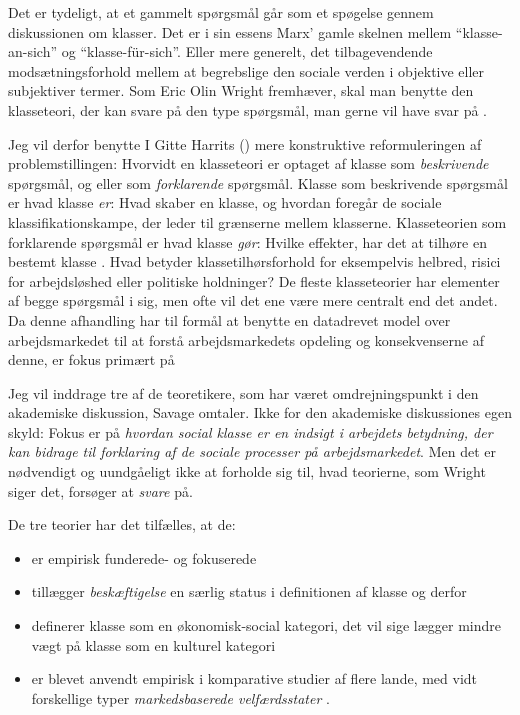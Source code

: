 Det er tydeligt, at et gammelt spørgsmål går som et spøgelse gennem diskussionen om klasser. Det er i sin essens Marx' gamle skelnen mellem  “klasse-an-sich” og “klasse-für-sich”. Eller mere generelt, det tilbagevendende modsætningsforhold mellem at begrebslige den sociale verden i objektive eller subjektiver termer. Som Eric Olin Wright fremhæver, skal man benytte den klasseteori, der kan svare på den type spørgsmål, man gerne vil have svar på \parencite[330]{Lareau2008}.

Jeg vil derfor benytte I Gitte Harrits (\citeyear{Harrits2014})  mere konstruktive reformuleringen af problemstillingen: Hvorvidt en klasseteori er optaget af klasse som \emph{beskrivende} spørgsmål, og eller som \emph{forklarende} spørgsmål. Klasse som beskrivende spørgsmål er hvad klasse \emph{er}: Hvad skaber en klasse, og hvordan foregår de sociale klassifikationskampe, der leder til grænserne mellem klasserne. Klasseteorien som forklarende spørgsmål er hvad klasse \emph{gør}: Hvilke effekter, har det at tilhøre en bestemt klasse \parencite[19]{Harrits2014}. Hvad betyder klassetilhørsforhold for eksempelvis helbred, risici for arbejdsløshed eller politiske holdninger? De fleste klasseteorier har elementer af begge spørgsmål i sig, men ofte vil det ene være mere centralt end det andet. Da denne afhandling har til formål at benytte en datadrevet model over arbejdsmarkedet til at forstå arbejdsmarkedets opdeling og konsekvenserne af denne, er fokus primært på %

Jeg vil inddrage tre af de teoretikere, som har været omdrejningspunkt i den akademiske diskussion, Savage omtaler. Ikke for den akademiske diskussiones egen skyld: Fokus er på \emph{hvordan social klasse er en indsigt i arbejdets betydning, der kan bidrage til forklaring af de sociale processer på arbejdsmarkedet}. Men det er nødvendigt og uundgåeligt ikke at forholde sig til, hvad teorierne, som Wright siger det, forsøger at \emph{svare} på. 
 
De tre teorier har det tilfælles, at de:
%
\begin{itemize}
 \itemsep -0.5em
 	\item er empirisk funderede- og fokuserede
 	\item tillægger \emph{beskæftigelse} en særlig status i definitionen af klasse og derfor
 	\item definerer klasse som en økonomisk-social kategori, det vil sige lægger mindre vægt på klasse som en kulturel kategori
 	\item er blevet anvendt empirisk i komparative studier af flere lande, med vidt forskellige typer \emph{markedsbaserede velfærdsstater} \textcite{Esping-Andersen1990}.
\end{itemize}
%

